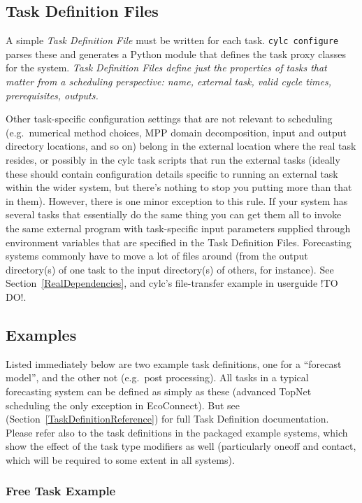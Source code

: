 \documentclass[11pt,a4paper]{article}
\begin{document}
\subsection{Task Definition Files} 
\label{TaskDefinitionFiles}

A simple {\em Task Definition File} must be written for each task.
\lstinline=cylc configure= parses these and generates a Python module
that defines the task proxy classes for the system. {\em Task
Definition Files define just the properties of tasks that matter from a
scheduling perspective: name, external task, valid cycle times,
prerequisites, outputs.} 

Other task-specific configuration settings that are not relevant to
scheduling (e.g.\ numerical method choices, MPP
domain decomposition, input and output directory locations, and so on)
belong in the external location where the real task resides, or possibly
in the cylc task scripts that run the external tasks (ideally these
should contain configuration details specific to running an external
task within the wider system, but there's nothing to stop you putting
more than that in them). However, there is one minor exception to this
rule. If your system has several tasks that essentially do the same
thing you can get them all to invoke the same external program with
task-specific input parameters supplied through environment variables
that are specified in the Task Definition Files. Forecasting systems
commonly have to move a lot of files around (from the output
directory(s) of one task to the input directory(s) of others, for
instance). See Section~\ref{RealDependencies}, and cylc's file-transfer
example in userguide !TO DO!. 

\subsection{Examples}

Listed immediately below are two example task definitions, one for a
``forecast model'', and the other not (e.g.\ post processing). All tasks
in a typical forecasting system can be defined as simply as these
(advanced TopNet scheduling the only exception in EcoConnect). 
But see (Section~\ref{TaskDefinitionReference}) for full Task Definition
documentation. Please refer also to the task definitions in the packaged
example systems, which show the effect of the task type modifiers as well
(particularly oneoff and contact, which will be required to some extent
in all systems).


\subsubsection{Free Task Example}
\end{document}
